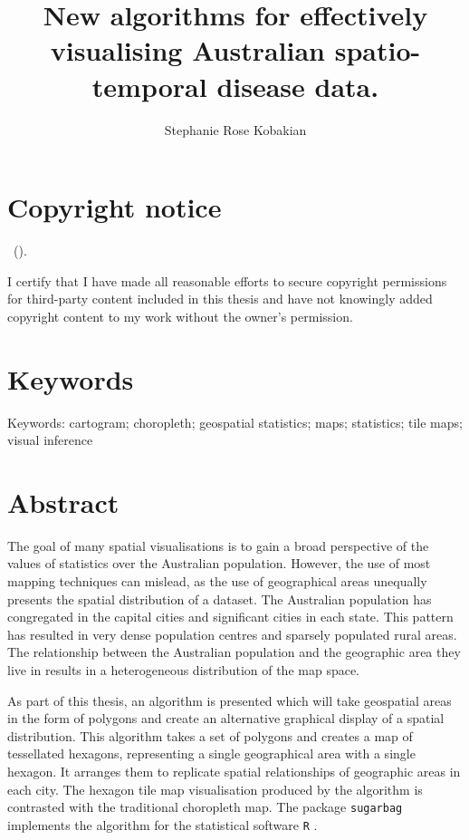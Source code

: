 \documentclass{monashthesis}
\author{Stephanie Rose Kobakian}
\title{New algorithms for effectively visualising Australian spatio-temporal disease data.}
\begin{document}

\titlepage

{\sf\tighttoc\doublespacing}

\hypertarget{copyright-notice}{%
\chapter*{Copyright notice}\label{copyright-notice}}

\textcopyright { } \authorname~(\number\the\year).

I certify that I have made all reasonable efforts to secure copyright permissions for third-party content included in this thesis and have not knowingly added copyright content to my work without the owner's permission.

\newpage

\hypertarget{keywords}{%
\chapter*{Keywords}\label{keywords}}

Keywords:
cartogram; choropleth; geospatial statistics; maps; statistics; tile maps; visual inference

\hypertarget{abstract}{%
\chapter*{Abstract}\label{abstract}}

The goal of many spatial visualisations is to gain a broad perspective of the values of statistics over the Australian population. However, the use of most mapping techniques can mislead, as the use of geographical areas unequally presents the spatial distribution of a dataset. The Australian population has congregated in the capital cities and significant cities in each state. This pattern has resulted in very dense population centres and sparsely populated rural areas. The relationship between the Australian population and the geographic area they live in results in a heterogeneous distribution of the map space.

As part of this thesis, an algorithm is presented which will take geospatial areas in the form of polygons and create an alternative graphical display of a spatial distribution. This algorithm takes a set of polygons and creates a map of tessellated hexagons, representing a single geographical area with a single hexagon. It arranges them to replicate spatial relationships of geographic areas in each city. The hexagon tile map visualisation produced by the algorithm is contrasted with the traditional choropleth map.
The package \texttt{sugarbag} \autocite{sugarbag} implements the algorithm for the statistical software \texttt{R} \autocite{R}.
\end{document}
